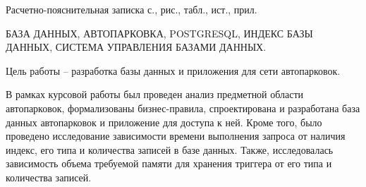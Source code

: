 
Расчетно-пояснительная записка \pageref{LastPage} с.,  рис.,  табл.,  ист.,  прил.

БАЗА ДАННЫХ, АВТОПАРКОВКА, POSTGRESQL, ИНДЕКС БАЗЫ ДАННЫХ, СИСТЕМА УПРАВЛЕНИЯ БАЗАМИ ДАННЫХ.

Цель работы -- разработка базы данных и приложения для сети автопарковок.

В рамках курсовой работы был проведен анализ предметной области автопарковок, формализованы  бизнес-правила, спроектирована и разработана база данных автопарковок и приложение для доступа к ней.
Кроме того, было проведено исследование зависимости времени выполнения запроса от наличия индекс, его типа и количества записей в базе данных.
Также, исследовалась зависимость объема требуемой памяти для хранения триггера от его типа и количества записей.
